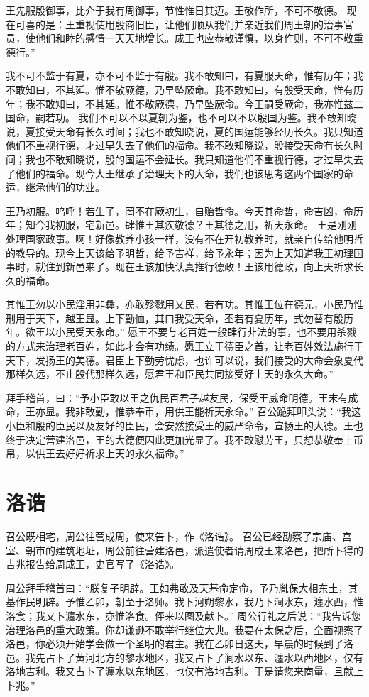 \documentclass[a4paper,12pt,UTF8,twoside]{ctexbook}
\begin{document}
王先服殷御事，比介于我有周御事，节性惟日其迈。王敬作所，不可不敬德。
现在可喜的是：王重视使用殷商旧臣，让他们顺从我们并亲近我们周王朝的治事官员，使他们和睦的感情一天天地增长。成王也应恭敬谨慎，以身作则，不可不敬重德行。”

我不可不监于有夏，亦不可不监于有殷。我不敢知曰，有夏服天命，惟有历年；我不敢知曰，不其延。惟不敬厥德，乃早坠厥命。我不敢知曰，有殷受天命，惟有历年；我不敢知曰，不其延。惟不敬厥德，乃早坠厥命。今王嗣受厥命，我亦惟兹二国命，嗣若功。
我们不可以不以夏朝为鉴，也不可以不以殷国为鉴。我不敢知晓说，夏接受天命有长久时间；我也不敢知晓说，夏的国运能够经历长久。我只知道他们不重视行德，才过早失去了他们的福命。我不敢知晓说，殷接受天命有长久时间；我也不敢知晓说，殷的国运不会延长。我只知道他们不重视行德，才过早失去了他们的福命。现今大王继承了治理天下的大命，我们也该思考这两个国家的命运，继承他们的功业。

王乃初服。呜呼！若生子，罔不在厥初生，自贻哲命。今天其命哲，命吉凶，命历年；知今我初服，宅新邑。肆惟王其疾敬德？王其德之用，祈天永命。
王是刚刚处理国家政事。啊！好像教养小孩一样，没有不在开初教养时，就亲自传给他明哲的教导的。现今上天该给予明哲，给予吉祥，给予永年；因为上天知道我王初理国事时，就住到新邑来了。现在王该加快认真推行德政！王该用德政，向上天祈求长久的福命。

其惟王勿以小民淫用非彝，亦敢殄戮用乂民，若有功。其惟王位在德元，小民乃惟刑用于天下，越王显。上下勤恤，其曰我受天命，丕若有夏历年，式勿替有殷历年。欲王以小民受天永命。”
愿王不要与老百姓一般肆行非法的事，也不要用杀戮的方式来治理老百姓，如此才会有功绩。愿王立于德臣之首，让老百姓效法施行于天下，发扬王的美德。君臣上下勤劳忧虑，也许可以说，我们接受的大命会象夏代那样久远，不止殷代那样久远，愿君王和臣民共同接受好上天的永久大命。”

拜手稽首，曰：“予小臣敢以王之仇民百君子越友民，保受王威命明德。王末有成命，王亦显。我非敢勤，惟恭奉币，用供王能祈天永命。”
召公跪拜叩头说：“我这小臣和殷的臣民以及友好的臣民，会安然接受王的威严命令，宣扬王的大德。王也终于决定营建洛邑，王的大德便因此更加光显了。我不敢慰劳王，只想恭敬奉上币帛，以供王去好好祈求上天的永久福命。”

\chapter{洛诰}

召公既相宅，周公往营成周，使来告卜，作《洛诰》。
召公已经勘察了宗庙、宫室、朝市的建筑地址，周公前往营建洛邑，派遣使者请周成王来洛邑，把所卜得的吉兆报告给周成王，史官写了《洛诰》。

周公拜手稽首曰：“朕复子明辟。王如弗敢及天基命定命，予乃胤保大相东土，其基作民明辟。予惟乙卯，朝至于洛师。我卜河朔黎水，我乃卜涧水东，瀍水西，惟洛食；我又卜瀍水东，亦惟洛食。伻来以图及献卜。”
周公行礼之后说：“我告诉您治理洛邑的重大政策。你却谦逊不敢举行继位大典。我要在太保之后，全面视察了洛邑，你必须开始学会做一个圣明的君主。我在乙卯日这天，早晨的时候到了洛邑。我先占卜了黄河北方的黎水地区，我又占卜了涧水以东、瀍水以西地区，仅有洛地吉利。我又占卜了瀍水以东地区，也仅有洛地吉利。于是请您来商量，且献上卜兆。”
\end{document}
